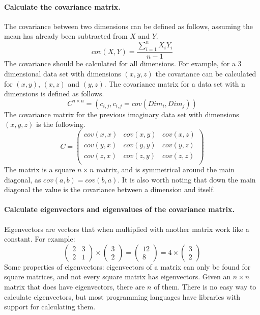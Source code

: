 \paragraph{Calculate the covariance matrix.}
The covariance between two dimensions can be defined as follows, assuming the mean has already been subtracted from $X$ and $Y$.
$$cov(X, Y) = \frac{\sum_{i=1}^{n} X_iY_i}{n-1}$$
The covariance should be calculated for all dimensions.
For example, for a 3 dimensional data set with dimensions $(x,y,z)$ the covariance can be calculated for $(x,y)$, $(x,z)$ and $(y,z)$.
The covariance matrix for a data set with n dimensions is defined as follows.
$$C^{n\times n} = (c_{i,j}, c_{i,j} = cov(Dim_i, Dim_j))$$
The covariance matrix for the previous imaginary data set with dimensions $(x,y,z)$ is the following.
$$
C= \begin{pmatrix}
cov(x,x) & cov(x,y) & cov(x,z) \\
cov(y,x) & cov(y,y) & cov(y,z) \\
cov(z,x) & cov(z,y) & cov(z,z) \\
\end{pmatrix}
$$
The matrix is a square $n\times n$ matrix, and is symmetrical around the main diagonal, as $cov(a,b) = cov(b,a)$.
It is also worth noting that down the main diagonal the value is the covariance between a dimension and itself.

\paragraph{Calculate eigenvectors and eigenvalues of the covariance matrix.}
Eigenvectors are vectors that when multiplied with another matrix work like a constant. For example:
$$
\begin{pmatrix}
2 & 3 \\
2 & 1
\end{pmatrix}
\times
\begin{pmatrix}
3\\
2
\end{pmatrix}
=
\begin{pmatrix}
12 \\
8
\end{pmatrix}
=
4 \times
\begin{pmatrix}
3 \\
2
\end{pmatrix}
$$
Some properties of eigenvectors: eigenvectors of a matrix can only be found for square matrices, and not every square matrix has eigenvectors. 
Given an $n\times n$ matrix that does have eigenvectors, there are $n$ of them.
There is no easy way to calculate eigenvectors, but most programming languages have libraries with support for calculating them.

